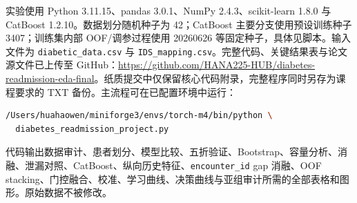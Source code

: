 \documentclass[UTF8,a4paper,11pt,fontset=none]{ctexart}
\begin{document}
实验使用 Python 3.11.15、pandas 3.0.1、NumPy 2.4.3、scikit-learn 1.8.0\cite{pedregosa2011} 与 CatBoost 1.2.10。数据划分随机种子为 42；CatBoost 主要分支使用预设训练种子 3407；训练集内部 OOF/调参过程使用 20260626 等固定种子，具体见脚本。输入文件为 \texttt{diabetic\_data.csv} 与 \texttt{IDS\_mapping.csv}。完整代码、关键结果表与论文源文件已上传至 GitHub：\url{https://github.com/HANA225-HUB/diabetes-readmission-eda-final}。纸质提交中仅保留核心代码附录，完整程序同时另存为课程要求的 TXT 备份。主流程可在已配置环境中运行：

\begin{lstlisting}[language=bash]
/Users/huahaowen/miniforge3/envs/torch-m4/bin/python \
  diabetes_readmission_project.py
\end{lstlisting}

代码输出数据审计、患者划分、模型比较、五折验证、Bootstrap、容量分析、消融、泄漏对照、CatBoost、纵向历史特征、\texttt{encounter\_id} gap 消融、OOF stacking、门控融合、校准、学习曲线、决策曲线与亚组审计所需的全部表格和图形。原始数据不被修改。
\end{document}
